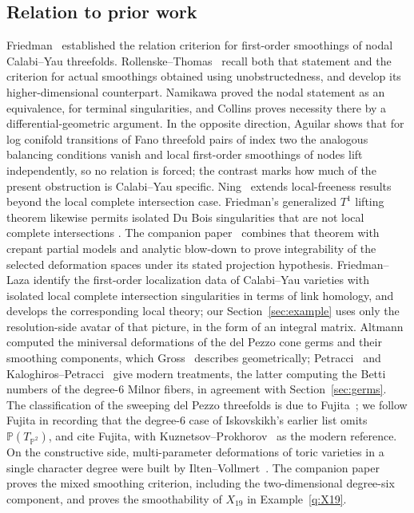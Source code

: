 \documentclass[11pt]{amsart}
\theoremstyle{definition}
\theoremstyle{remark}
\theoremstyle{plain}
\newcommand{\PP}{\mathbb{P}}
\begin{document}
\subsection{Relation to prior work}
Friedman~\cite{Friedman86} established the relation criterion for
first-order smoothings of nodal Calabi--Yau threefolds.
Rollenske--Thomas~\cite[Thms.~1.2--1.3]{RT09} recall both that statement
and the criterion for actual smoothings obtained using unobstructedness,
and develop its higher-dimensional counterpart.  Namikawa
\cite[Theorem~2.5]{Namikawa02} proved the nodal statement as an
equivalence, for terminal singularities, and Collins
\cite[\S4]{Collins25} proves necessity there by a differential-geometric
argument.  In the opposite direction, Aguilar \cite{Aguilar26} shows that
for log conifold transitions of Fano threefold pairs of index two the
analogous balancing conditions vanish and
local first-order smoothings of nodes lift independently, so no relation is forced;
the contrast marks how much of the present obstruction is Calabi--Yau
specific.  Ning~\cite{Ning26} extends local-freeness results beyond the local
complete intersection case.  Friedman's generalized $T^1$ lifting
theorem likewise permits isolated Du Bois singularities that are not
local complete intersections \cite[Thm.~3.10]{Friedman25}.
The companion paper~\cite{PaperV} combines that theorem with crepant
partial models and analytic blow-down to prove integrability of the
selected deformation spaces under its stated projection hypothesis.
Friedman--Laza
\cite[\S5]{FL22a} identify the first-order localization data of
Calabi--Yau varieties with isolated local complete intersection
singularities in terms of link homology, and \cite{FL22b} develops the
corresponding local theory; our
Section~\ref{sec:example} uses only the resolution-side avatar of
that picture, in the form of an integral matrix.
Altmann~\cite{Altmann95,Altmann97} computed the miniversal deformations of
the del Pezzo cone germs and their smoothing components, which
Gross~\cite[\S5.5]{Gross97} describes geometrically;
Petracci~\cite{Petracci20,Petracci19} and
Kaloghiros--Petracci~\cite{KP21} give modern treatments, the latter
computing the Betti numbers of the degree-$6$ Milnor fibers, in
agreement with Section~\ref{sec:germs}.  The classification of the
sweeping del Pezzo threefolds is due to Fujita~\cite{Fujita80a}; we
follow Fujita in recording that the degree-$6$ case of Iskovskikh's earlier list
omits $\PP(T_{\PP^2})$, and cite Fujita, with
Kuznetsov--Prokhorov~\cite{KP23} as the modern reference.  On the
constructive side, multi-parameter deformations of toric varieties in
a single character degree were built by
Ilten--Vollmert~\cite{IV12}.  The companion paper~\cite{PaperV}
proves the mixed smoothing criterion, including the two-dimensional
degree-six component, and proves the smoothability of
$X_{19}$ in Example~\ref{q:X19}.
\end{document}
